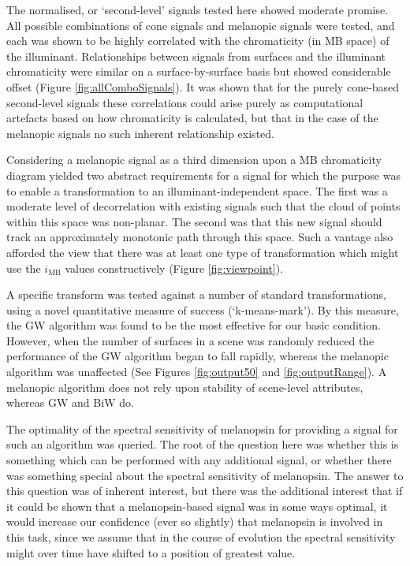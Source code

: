 The normalised, or `second-level' signals tested here showed moderate promise. All possible combinations of cone signals and melanopic signals were tested, and each was shown to be highly correlated with the chromaticity (in \gls{MB} space) of the illuminant. Relationships between signals from surfaces and the illuminant chromaticity were similar on a surface-by-surface basis but showed considerable offset (Figure \ref{fig:allComboSignals}). It was shown that for the purely cone-based second-level signals these correlations could arise purely as computational artefacts based on how chromaticity is calculated, but that in the case of the melanopic signals no such inherent relationship existed.

Considering a melanopic signal as a third dimension upon a \gls{MB} chromaticity diagram yielded two abstract requirements for a signal for which the purpose was to enable a transformation to an illuminant-independent space. The first was a moderate level of decorrelation with existing signals such that the cloud of points within this space was non-planar. The second was that this new signal should track an approximately monotonic path through this space. Such a vantage also afforded the view that there was at least one type of transformation which might use the $i_{\text{MB}}$ values constructively (Figure \ref{fig:viewpoint}).

A specific transform was tested against a number of standard transformations, using a novel quantitative measure of success (`k-means-mark'). By this measure, the \gls{GW} algorithm was found to be the most effective for our basic condition. However, when the number of surfaces in a scene was randomly reduced the performance of the \gls{GW} algorithm began to fall rapidly, whereas the melanopic algorithm was unaffected (See Figures \ref{fig:output50} and \ref{fig:outputRange}). A melanopic algorithm does not rely upon stability of scene-level attributes, whereas \gls{GW} and \gls{BiW} do.

The optimality of the spectral sensitivity of melanopsin for providing a signal for such an algorithm was queried. The root of the question here was whether this is something which can be performed with any additional signal, or whether there was something special about the spectral sensitivity of melanopsin. The answer to this question was of inherent interest, but there was the additional interest that if it could be shown that a melanopsin-based signal was in some ways optimal, it would increase our confidence (ever so slightly) that melanopsin is involved in this task, since we assume that in the course of evolution the spectral sensitivity might over time have shifted to a position of greatest value.


